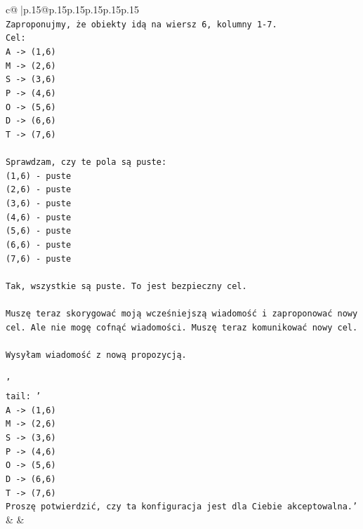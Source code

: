 \documentclass{article}
\begin{document}
{\begin{supertabular}{c@{$\;$}|p{.15\linewidth}@{}p{.15\linewidth}p{.15\linewidth}p{.15\linewidth}p{.15\linewidth}p{.15\linewidth}}
{{{\\ 
\texttt{Zaproponujmy, że obiekty idą na wiersz 6, kolumny 1{-}7.} \\
\texttt{Cel:} \\
\texttt{A {-}> (1,6)} \\
\texttt{M {-}> (2,6)} \\
\texttt{S {-}> (3,6)} \\
\texttt{P {-}> (4,6)} \\
\texttt{O {-}> (5,6)} \\
\texttt{D {-}> (6,6)} \\
\texttt{T {-}> (7,6)} \\
\\ 
\texttt{Sprawdzam, czy te pola są puste:} \\
\texttt{(1,6) {-} puste} \\
\texttt{(2,6) {-} puste} \\
\texttt{(3,6) {-} puste} \\
\texttt{(4,6) {-} puste} \\
\texttt{(5,6) {-} puste} \\
\texttt{(6,6) {-} puste} \\
\texttt{(7,6) {-} puste} \\
\\ 
\texttt{Tak, wszystkie są puste. To jest bezpieczny cel.} \\
\\ 
\texttt{Muszę teraz skorygować moją wcześniejszą wiadomość i zaproponować nowy cel. Ale nie mogę cofnąć wiadomości. Muszę teraz komunikować nowy cel.} \\
\\ 
\texttt{Wysyłam wiadomość z nową propozycją.} \\
\\ 
\texttt{'} \\
\texttt{tail: '} \\
\texttt{A {-}> (1,6)} \\
\texttt{M {-}> (2,6)} \\
\texttt{S {-}> (3,6)} \\
\texttt{P {-}> (4,6)} \\
\texttt{O {-}> (5,6)} \\
\texttt{D {-}> (6,6)} \\
\texttt{T {-}> (7,6)} \\
\texttt{Proszę potwierdzić, czy ta konfiguracja jest dla Ciebie akceptowalna.'} \\
            }
        }
    }
    & & \\ \\


\end{supertabular}}
\end{document}
